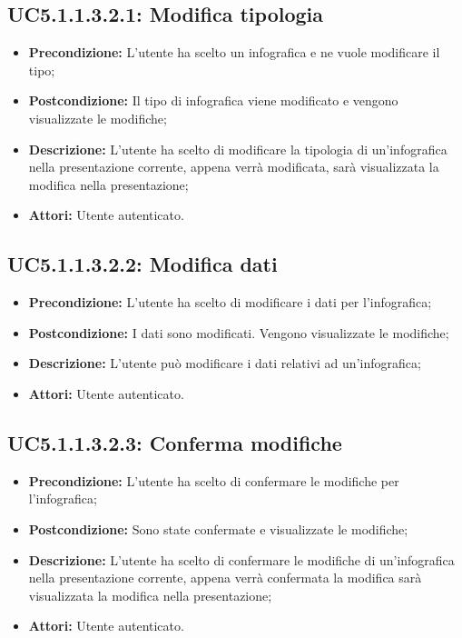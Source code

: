\subsection{ UC5.1.1.3.2.1: Modifica tipologia}

\begin{itemize}
	\item \textbf{Precondizione:} L'utente ha scelto un infografica e ne vuole modificare il tipo;
	\item \textbf{Postcondizione:} Il tipo di infografica viene modificato e vengono visualizzate le modifiche;
	\item \textbf{Descrizione:} L'utente ha scelto di modificare la tipologia di un'infografica nella presentazione corrente, appena verrà modificata, sarà visualizzata la modifica nella presentazione;
	\item \textbf{Attori:} Utente autenticato.
\end{itemize}
\subsection{ UC5.1.1.3.2.2: Modifica dati}

\begin{itemize}
	\item \textbf{Precondizione:} L'utente ha scelto di modificare i dati per l'infografica;
	\item \textbf{Postcondizione:} I dati sono modificati. Vengono visualizzate le modifiche;
	\item \textbf{Descrizione:} L'utente può modificare i dati relativi ad un'infografica;
	\item \textbf{Attori:} Utente autenticato.
\end{itemize}
\subsection{ UC5.1.1.3.2.3: Conferma modifiche}

\begin{itemize}
	\item \textbf{Precondizione:} L'utente ha scelto di confermare le modifiche per l'infografica;
	\item \textbf{Postcondizione:} Sono state confermate e visualizzate le modifiche;
	\item \textbf{Descrizione:} L'utente ha scelto di confermare le modifiche di un'infografica nella presentazione corrente, appena verrà confermata la modifica sarà visualizzata la modifica nella presentazione;
	\item \textbf{Attori:} Utente autenticato.
\end{itemize}
